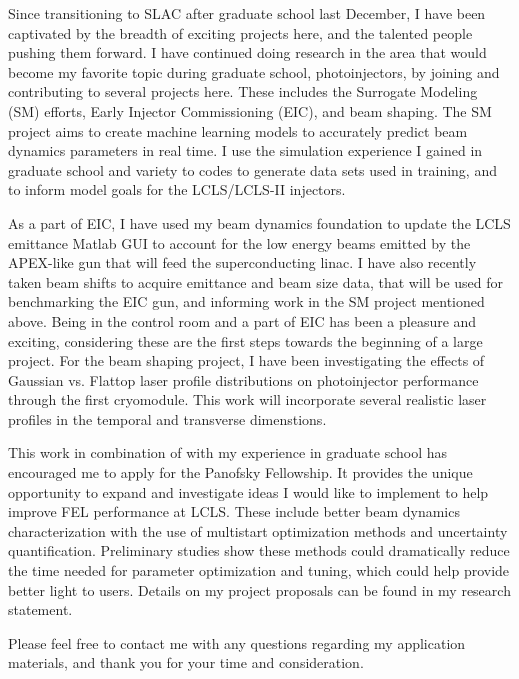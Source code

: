 Since transitioning to SLAC after graduate school last December, 
I have been captivated by the breadth of exciting projects here, 
and the talented people pushing them forward.
I have continued doing research in the area that
 would become my favorite topic during graduate school, photoinjectors, 
 by joining and contributing to several projects here. 
 These includes the Surrogate Modeling (SM) efforts, Early Injector Commissioning (EIC), and beam shaping. 
 The SM project aims to create machine learning models to accurately predict 
 beam dynamics parameters in real time. I use the simulation experience I gained in graduate school and variety to codes to generate data sets used in training, 
 and to inform model goals for the LCLS/LCLS-II injectors.
 
 As a part of EIC, I have used my beam dynamics foundation to update the 
 LCLS emittance Matlab GUI to account for the low energy beams emitted by the 
 APEX-like gun that will feed the superconducting linac. I have also recently 
 taken beam shifts to acquire emittance and beam size data, that will be used 
 for benchmarking the EIC gun, and informing work in the SM project mentioned above. 
 Being in the control room and a part of EIC has been a pleasure and exciting, 
 considering these are the first steps towards the beginning of a large project.
 For the beam shaping project, I have been investigating the effects of Gaussian vs. 
 Flattop laser profile distributions on photoinjector performance through the first cryomodule. This work will incorporate several realistic laser profiles in the temporal and transverse dimenstions. 
 
 This work in combination of with my experience in graduate school has encouraged me 
 to apply for the Panofsky Fellowship. It provides the unique opportunity to expand and investigate ideas I would like to implement to help improve FEL performance at LCLS. These include better beam dynamics characterization with the use of multistart optimization methods and uncertainty quantification. Preliminary studies show these methods could dramatically reduce the time needed for parameter optimization and tuning, which could help provide better light to users. Details on my project proposals can be found in my research statement.
 
 Please feel free to contact me with any questions regarding my application materials, and thank you for your time and consideration. 
 